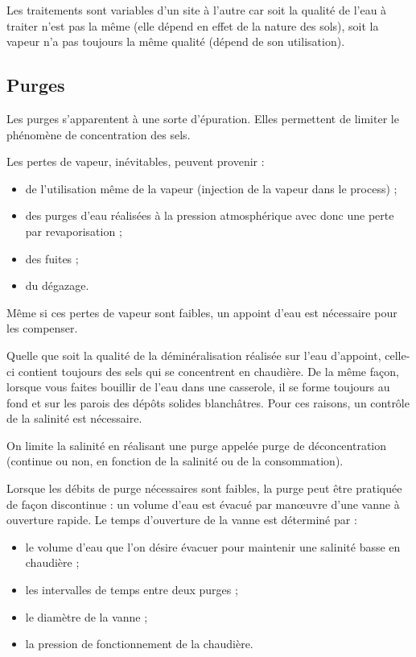 Les traitements sont variables d’un site à l’autre car soit la qualité de l’eau à traiter n’est pas la même (elle dépend en effet de la nature des sols), soit la vapeur n’a pas toujours la même qualité (dépend de son utilisation).


\subsection{	Purges} 

Les purges s’apparentent à une sorte d’épuration. Elles permettent de limiter le phénomène de concentration des sels.

Les pertes de vapeur, inévitables, peuvent provenir :


\begin{itemize}
\item  de l’utilisation même de la vapeur (injection de la vapeur dans le process) ;
\item  des purges d’eau réalisées à la pression atmosphérique avec donc une perte par revaporisation ;
\item  des fuites ;
\item  du dégazage.

\end{itemize}


Même si ces pertes de vapeur sont faibles, un appoint d’eau est nécessaire pour les compenser.

Quelle que soit la qualité de la déminéralisation réalisée sur l’eau d’appoint, celle-ci contient toujours des sels qui se concentrent en chaudière. De la même façon, lorsque vous faites bouillir de l’eau dans une casserole, il se forme toujours au fond et sur les parois des dépôts solides blanchâtres.
Pour ces raisons, un contrôle de la salinité est nécessaire.
\vspace{0.3cm}

On limite la salinité en réalisant une purge appelée purge de déconcentration (continue ou non, en fonction de la salinité ou de la consommation).
\vspace{0.3cm}

Lorsque les débits de purge nécessaires sont faibles, la purge peut être pratiquée de façon discontinue : un volume d’eau est évacué par manœuvre d’une vanne à ouverture rapide.
Le temps d’ouverture de la vanne est déterminé par :


 \begin{itemize}
\item  le volume d’eau que l’on désire évacuer pour maintenir une salinité basse en chaudière ;
\item  les intervalles de temps entre deux purges ;
\item  le diamètre de la vanne ;
\item  la pression de fonctionnement de la chaudière.

\end{itemize}


